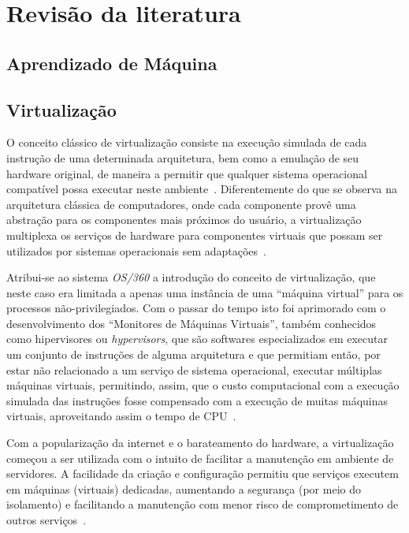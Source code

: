 %
%

\chapter{Revisão da literatura}

\section{Aprendizado de Máquina}\label{sec:aprendizado}



\section{Virtualização}\label{sec:virt}

O conceito clássico de virtualização consiste na execução simulada de cada
instrução de uma determinada arquitetura, bem como a emulação de seu
hardware original, de maneira a permitir que qualquer sistema operacional
compatível possa executar neste ambiente~\cite{goldberg1974survey}.
Diferentemente do que se observa na arquitetura clássica de computadores,
onde cada componente provê uma abstração para os componentes mais próximos do
usuário, a virtualização multiplexa os serviços de hardware para
componentes virtuais que possam ser utilizados por sistemas operacionais
sem adaptações~\cite{dutra2009a}.


Atribui-se ao sistema \emph{OS/360} a introdução do conceito de
virtualização, que neste caso era limitada a apenas uma instância de uma
``máquina virtual'' para os processos não-privilegiados. Com o passar do
tempo isto foi aprimorado com o desenvolvimento dos ``Monitores de
Máquinas Virtuais'', também conhecidos como hipervisores ou
\emph{hypervisors}, que são softwares especializados em executar um
conjunto de instruções de alguma arquitetura e que permitiam então, por
estar não relacionado a um serviço de sistema operacional, executar
múltiplas máquinas virtuais, permitindo, assim, que o custo computacional com
a execução simulada das instruções fosse compensado com a execução de
muitas máquinas virtuais, aproveitando assim o tempo de
CPU~\cite{goldberg1974survey}.

Com a popularização da internet e o barateamento do hardware, a
virtualização começou a ser utilizada com o intuito de facilitar a
manutenção em ambiente de servidores. A facilidade da criação e
configuração permitiu que serviços executem em máquinas (virtuais)
dedicadas, aumentando a segurança (por meio do isolamento) e facilitando a
manutenção com menor risco de comprometimento de outros
serviços~\cite{smith2005architecture}.

